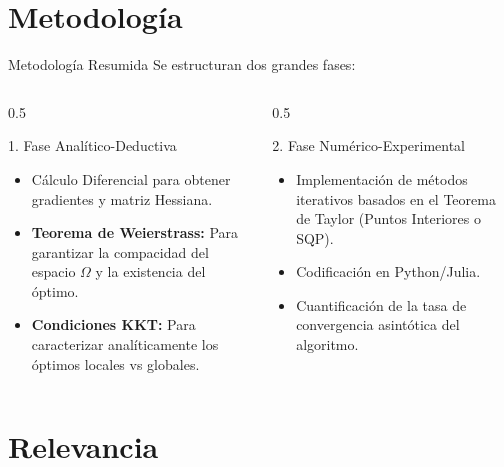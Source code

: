 \documentclass[10pt]{beamer}
\begin{document}
\section{Metodología}

\begin{frame}{Metodología Resumida}
    Se estructuran dos grandes fases:
    \begin{columns}[T]
        \begin{column}{0.5\textwidth}
            \begin{block}{1. Fase Analítico-Deductiva}
            \begin{itemize}
                \item Cálculo Diferencial para obtener gradientes y matriz Hessiana.
                \item \textbf{Teorema de Weierstrass:} Para garantizar la compacidad del espacio $\Omega$ y la existencia del óptimo.
                \item \textbf{Condiciones KKT:} Para caracterizar analíticamente los óptimos locales vs globales.
            \end{itemize}
            \end{block}
        \end{column}
        \begin{column}{0.5\textwidth}
            \begin{block}{2. Fase Numérico-Experimental}
            \begin{itemize}
                \item Implementación de métodos iterativos basados en el Teorema de Taylor (Puntos Interiores o SQP).
                \item Codificación en Python/Julia.
                \item Cuantificación de la tasa de convergencia asintótica del algoritmo.
            \end{itemize}
            \end{block}
        \end{column}
    \end{columns}
\end{frame}

\section{Relevancia}
\end{document}

